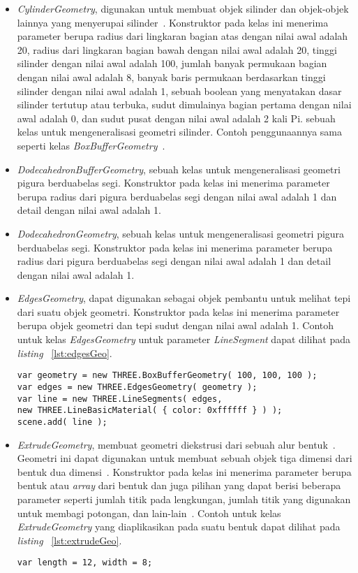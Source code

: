 \begin{itemize}
\begin{itemize}
		\item {\it CylinderGeometry}, digunakan untuk membuat objek silinder dan objek-objek lainnya yang menyerupai silinder~\cite{learningThreejs}. Konstruktor pada kelas ini menerima parameter berupa radius dari lingkaran bagian atas dengan nilai awal adalah 20, radius dari lingkaran bagian bawah dengan nilai awal adalah 20, tinggi silinder dengan nilai awal adalah 100, jumlah banyak permukaan bagian dengan nilai awal adalah 8, banyak baris permukaan berdasarkan tinggi silinder dengan nilai awal adalah 1, sebuah boolean yang menyatakan dasar silinder tertutup atau terbuka, sudut dimulainya bagian pertama dengan nilai awal adalah 0, dan sudut pusat dengan nilai awal adalah 2 kali Pi. sebuah kelas untuk mengeneralisasi geometri silinder. Contoh penggunaannya sama seperti kelas {\it BoxBufferGeometry}~\cite{threejs}.
		\item {\it DodecahedronBufferGeometry}, sebuah kelas untuk mengeneralisasi geometri pigura berduabelas segi. Konstruktor pada kelas ini menerima parameter berupa radius dari pigura berduabelas segi dengan nilai awal adalah 1 dan detail dengan nilai awal adalah 1.
		\item {\it DodecahedronGeometry}, sebuah kelas untuk mengeneralisasi geometri pigura berduabelas segi. Konstruktor pada kelas ini menerima parameter berupa radius dari pigura berduabelas segi dengan nilai awal adalah 1 dan detail dengan nilai awal adalah 1.
		\item {\it EdgesGeometry}, dapat digunakan sebagai objek pembantu untuk melihat tepi dari suatu objek geometri. Konstruktor pada kelas ini menerima parameter berupa objek geometri dan tepi sudut dengan nilai awal adalah 1. Contoh untuk kelas {\it EdgesGeometry} untuk parameter {\it LineSegment} dapat dilihat pada {\it listing} ~\ref{lst:edgesGeo}.
\begin{lstlisting}[caption={Contoh penggunaan kelas {\it EdgesGeometry}.}, label={lst:edgesGeo},captionpos=b]
var geometry = new THREE.BoxBufferGeometry( 100, 100, 100 );
var edges = new THREE.EdgesGeometry( geometry );
var line = new THREE.LineSegments( edges,
new THREE.LineBasicMaterial( { color: 0xffffff } ) );
scene.add( line );
\end{lstlisting}
		\item {\it ExtrudeGeometry}, membuat geometri diekstrusi dari sebuah alur bentuk~\cite{threejs}. Geometri ini dapat digunakan untuk membuat sebuah objek tiga dimensi dari bentuk dua dimensi~\cite{learningThreejs}. Konstruktor pada kelas ini menerima parameter berupa bentuk atau {\it array} dari bentuk dan juga pilihan yang dapat berisi beberapa parameter seperti jumlah titik pada lengkungan, jumlah titik yang digunakan untuk membagi potongan, dan lain-lain~\cite{threejs}. Contoh untuk kelas {\it ExtrudeGeometry} yang diaplikasikan pada suatu bentuk dapat dilihat pada {\it listing} ~\ref{lst:extrudeGeo}.
\begin{lstlisting}[caption={Contoh penggunaan kelas {\it ExtrudeGeometry}.}, label={lst:extrudeGeo},captionpos=b]
var length = 12, width = 8;


\end{lstlisting}
\end{itemize}
\end{itemize}
